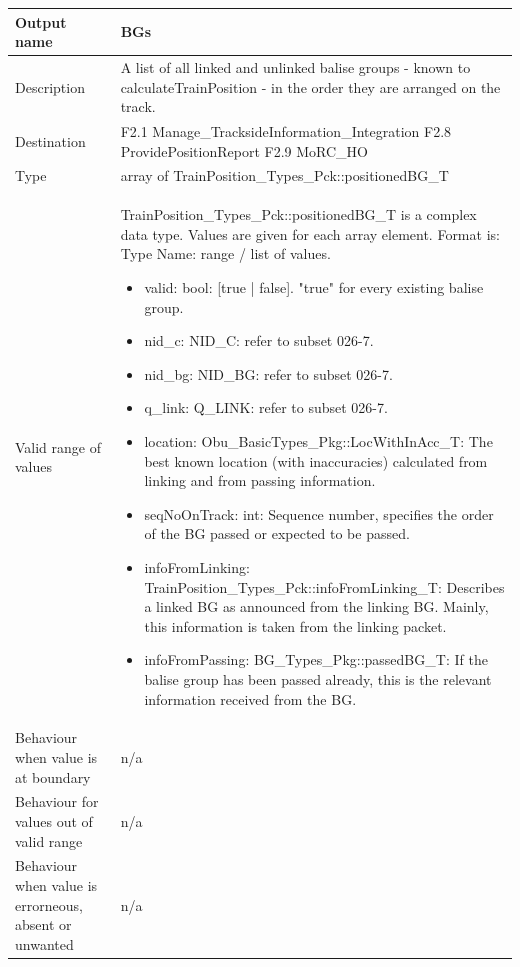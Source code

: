 \begin{longtable}{p{}p{}}
\toprule
Output name				& BGs \\
\midrule
Description				& A list of all linked and unlinked balise groups - known to calculateTrainPosition - in the order they are arranged on the track.   \\
\midrule
Destination				& F2.1 Manage\_TracksideInformation\_Integration\newline
F2.8 ProvidePositionReport\newline
F2.9 MoRC\_HO \\ 
\midrule
Type					& array of TrainPosition\_Types\_Pck::positionedBG\_T \\  
\midrule
Valid range of values	& TrainPosition\_Types\_Pck::positionedBG\_T is a complex data type. Values are given for each array element. Format is: Type Name: range / list of values.
\begin{itemize}
	\item valid: bool: [true | false]. "true" for every existing balise group.
	\item nid\_c: NID\_C: refer to subset 026-7. 
	\item nid\_bg: NID\_BG: refer to subset 026-7. 
	\item q\_link: Q\_LINK: refer to subset 026-7. 
	\item location: Obu\_BasicTypes\_Pkg::LocWithInAcc\_T: The best known location (with inaccuracies) calculated from linking and from passing information.
	\item seqNoOnTrack: int: Sequence number, specifies the order of the BG passed or expected to be passed.
	\item infoFromLinking: TrainPosition\_Types\_Pck::infoFromLinking\_T: Describes a linked BG as announced from the linking BG. Mainly, this information is taken from the linking packet.
	\item infoFromPassing: BG\_Types\_Pkg::passedBG\_T: If the balise group has been passed already, this is the relevant information received from the BG.
\end{itemize} 
\\
\midrule
Behaviour when value is at boundary		& n/a \\
\midrule
Behaviour for values out of valid range	& n/a \\
\midrule
Behaviour when value is errorneous, absent or unwanted & n/a \\
\bottomrule
\end{longtable}


